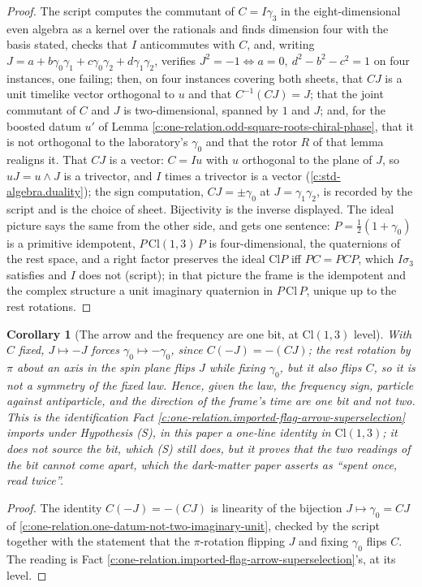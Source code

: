 \documentclass[11pt]{article}
\newtheorem{corollary}[theorem]{Corollary}
\theoremstyle{definition}
\theoremstyle{plain}
\newcommand{\changedmark}[2]{\marginpar{\raggedright\scriptsize\color{#1}#2}}
\providecommand{\Cl}{}\renewcommand{\Cl}{\mathrm{Cl}}
\begin{document}
\begin{proof}
The script computes the commutant of $C = I\gamma_{3}$ in the eight-dimensional even algebra as a kernel over the rationals and finds dimension four with the basis stated, checks that $I$ anticommutes with $C$, and, writing $J = a + b\gamma_{0}\gamma_{1} + c\gamma_{0}\gamma_{2} + d\gamma_{1}\gamma_{2}$, verifies $J^{2} = -1 \iff a = 0,\ d^{2} - b^{2} - c^{2} = 1$ on four instances, one failing; then, on four instances covering both sheets, that $CJ$ is a unit timelike vector orthogonal to $u$ and that $C^{-1}(CJ) = J$; that the joint commutant of $C$ and $J$ is two-dimensional, spanned by $1$ and $J$; and, for the boosted datum $u'$ of Lemma \ref{c:one-relation.odd-square-roots-chiral-phase}, that it is not orthogonal to the laboratory's $\gamma_{0}$ and that the rotor $R$ of that lemma realigns it. That $CJ$ is a vector: $C = Iu$ with $u$ orthogonal to the plane of $J$, so $uJ = u \wedge J$ is a trivector, and $I$ times a trivector is a vector (\ref{c:std-algebra.duality}); the sign computation, $CJ = \pm\gamma_{0}$ at $J = \gamma_{1}\gamma_{2}$, is recorded by the script and is the choice of sheet. Bijectivity is the inverse displayed. The ideal picture says the same from the other side, and gets one sentence: $P = \tfrac12(1 + \gamma_{0})$ is a primitive idempotent, $P\,\Cl(1,3)\,P$ is four-dimensional, the quaternions of the rest space, and a right factor preserves the ideal $\Cl P$ iff $PC = PCP$, which $I\sigma_{3}$ satisfies and $I$ does not (script); in that picture the frame is the idempotent and the complex structure a unit imaginary quaternion in $P\,\Cl\,P$, unique up to the rest rotations.

\end{proof}

\begin{corollary}[The arrow and the frequency are one bit, at $\Cl(1,3)$ level]\label{c:one-relation.arrow-frequency-are-one-bit-level}
\changedmark{gray}{reworded}
With $C$ fixed, $J \mapsto -J$ forces $\gamma_{0} \mapsto -\gamma_{0}$, since $C(-J) = -(CJ)$; the rest rotation by $\pi$ about an axis in the spin plane flips $J$ while fixing $\gamma_{0}$, but it also flips $C$, so it is not a symmetry of the fixed law. Hence, given the law, the frequency sign, particle against antiparticle, and the direction of the frame's time are one bit and not two. This is the identification Fact \ref{c:one-relation.imported-flag-arrow-superselection} imports under Hypothesis (S), in this paper a one-line identity in $\Cl(1,3)$; it does not source the bit, which (S) still does, but it proves that the two readings of the bit cannot come apart, which the dark-matter paper asserts as ``spent once, read twice''.
\end{corollary}
\begin{proof}
The identity $C(-J) = -(CJ)$ is linearity of the bijection $J \mapsto \gamma_{0} = CJ$ of \ref{c:one-relation.one-datum-not-two-imaginary-unit}, checked by the script together with the statement that the $\pi$-rotation flipping $J$ and fixing $\gamma_{0}$ flips $C$. The reading is Fact \ref{c:one-relation.imported-flag-arrow-superselection}'s, at its level.

\end{proof}
\end{document}
